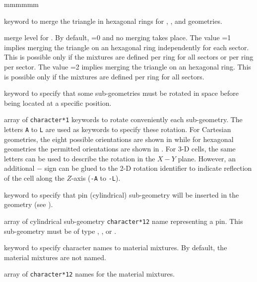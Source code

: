 \begin{ListeDeDescription}{mmmmmm}
\item[\moc{HTMERGE}] keyword to merge the triangle in hexagonal rings for , ,  and  geometries. 

\item[\dusa{ihtm}] merge level for . By default, =0 and no merging takes place. The value =1 implies merging the triangle on an hexagonal ring independently for each sector. This is possible only if the mixtures are defined per ring for all sectors or per ring per sector. The value =2 implies merging the triangle on an hexagonal ring. This is possible only if the mixtures are defined per ring for all sectors.

\item[\moc{TURN}] keyword to specify that some sub-geometries must be rotated
in space before being located at a specific position.

\item[\dusa{HTURN}] array of  {\tt character*1} keywords to rotate
conveniently each sub-geometry. The letters {\tt A} to {\tt L} are used as
keywords to specify these rotation. For Cartesian geometries, the eight possible
orientations are shown in  while for hexagonal geometries
the permitted orientations are shown in . For 3-D cells, the
same letters can be used to describe the rotation in the $X-Y$ plane. However,
an additional $-$ sign can be glued to the 2-D rotation identifier to
indicate reflection of the cell along the $Z$-axis ({\tt -A} to {\tt -L}).

\item[\moc{CLUSTER}] keyword to specify that pin (cylindrical) sub-geometry
will be inserted in the geometry (see ). 

\item[\dusa{NAMPIN}] array of cylindrical sub-geometry {\tt character*12} name 
representing a pin. This sub-geometry must be of type , ,
 or .

\item[\moc{MIX-NAMES}] keyword to specify character names to material mixtures.
By default, the material mixtures are not named.

\item[\dusa{NAMMIX}] array of {\tt character*12} names for the material
mixtures.

\end{ListeDeDescription}

